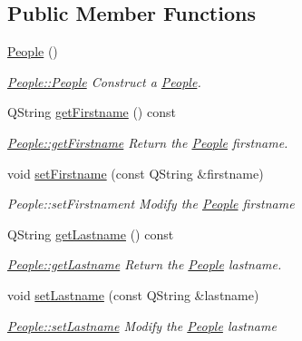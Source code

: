 \subsection*{Public Member Functions}
\begin{DoxyCompactItemize}
\item 
\hypertarget{classModels_1_1People_acdd7ec9d2f9815aeb230ca450cbcdbe3}{}\hyperlink{classModels_1_1People_acdd7ec9d2f9815aeb230ca450cbcdbe3}{People} ()\label{classModels_1_1People_acdd7ec9d2f9815aeb230ca450cbcdbe3}

\begin{DoxyCompactList}\small\item\em \hyperlink{classModels_1_1People_acdd7ec9d2f9815aeb230ca450cbcdbe3}{People\+::\+People} Construct a \hyperlink{classModels_1_1People}{People}. \end{DoxyCompactList}\item 
Q\+String \hyperlink{classModels_1_1People_ae7f110985bb461d8be359a135ec3bc48}{get\+Firstname} () const 
\begin{DoxyCompactList}\small\item\em \hyperlink{classModels_1_1People_ae7f110985bb461d8be359a135ec3bc48}{People\+::get\+Firstname} Return the \hyperlink{classModels_1_1People}{People} firstname. \end{DoxyCompactList}\item 
void \hyperlink{classModels_1_1People_a0bc1380b8c4bb29f59b09300edd1f354}{set\+Firstname} (const Q\+String \&firstname)
\begin{DoxyCompactList}\small\item\em People\+::set\+Firstnament Modify the \hyperlink{classModels_1_1People}{People} {\itshape firstname} \end{DoxyCompactList}\item 
Q\+String \hyperlink{classModels_1_1People_ae3e0992f5711b054a10bc50d8965be3c}{get\+Lastname} () const 
\begin{DoxyCompactList}\small\item\em \hyperlink{classModels_1_1People_ae3e0992f5711b054a10bc50d8965be3c}{People\+::get\+Lastname} Return the \hyperlink{classModels_1_1People}{People} lastname. \end{DoxyCompactList}\item 
void \hyperlink{classModels_1_1People_a550545199147a9947e5c66f9c154bf52}{set\+Lastname} (const Q\+String \&lastname)
\begin{DoxyCompactList}\small\item\em \hyperlink{classModels_1_1People_a550545199147a9947e5c66f9c154bf52}{People\+::set\+Lastname} Modify the \hyperlink{classModels_1_1People}{People} {\itshape lastname} \end{DoxyCompactList}\item 

\end{DoxyCompactItemize}
